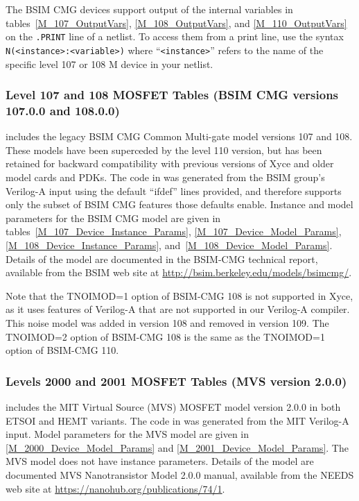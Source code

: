 The BSIM CMG devices support output of the internal variables in
tables~\ref{M_107_OutputVars}, \ref{M_108_OutputVars}, and  \ref{M_110_OutputVars} on the \texttt{.PRINT} line of a netlist.
To access them from a print line, use the syntax
\texttt{N(<instance>:<variable>)} where ``\texttt{<instance>}'' refers to the
name of the specific level 107 or 108 M device in your netlist.





\subsubsection{Level 107  and 108 MOSFET Tables (BSIM CMG versions 107.0.0 and 108.0.0)}
\Xyce{} includes the legacy BSIM CMG Common Multi-gate model versions 107 and 108.
These models have been superceded by the level 110 version, but has been
retained for backward compatibility with previous versions of Xyce and
older model cards and PDKs.  The code in \Xyce{} was generated from the BSIM
group's Verilog-A input using the default ``ifdef'' lines provided,
and therefore supports only the subset of BSIM CMG features those
defaults enable.  Instance and model parameters for the BSIM CMG model
are given in tables~\ref{M_107_Device_Instance_Params},
\ref{M_107_Device_Model_Params}, \ref{M_108_Device_Instance_Params},
and~\ref{M_108_Device_Model_Params}.  Details of the model are documented
in the BSIM-CMG technical report\cite{BSIMCMG:Manual}, available from
the BSIM web site at \url{http://bsim.berkeley.edu/models/bsimcmg/}.

Note that the TNOIMOD=1 option of BSIM-CMG 108 is not supported in
Xyce, as it uses features of Verilog-A that are not supported in our
Verilog-A compiler.  This noise model was added in version 108 and
removed in version 109.  The TNOIMOD=2 option of BSIM-CMG 108 is the
same as the TNOIMOD=1 option of BSIM-CMG 110.










\clearpage
\subsubsection{Levels 2000 and 2001 MOSFET Tables (MVS version 2.0.0)}
\Xyce{} includes the MIT Virtual Source (MVS) MOSFET model version
2.0.0 in both ETSOI and HEMT variants.  The code in \Xyce{} was
generated from the MIT Verilog-A input.  Model parameters for the MVS
model are given in \ref{M_2000_Device_Model_Params} and
\ref{M_2001_Device_Model_Params}.  The MVS model does not have
instance parameters.  Details of the model are documented MVS
Nanotransistor Model 2.0.0 manual, available from the NEEDS web site
at \url{https://nanohub.org/publications/74/1}.

